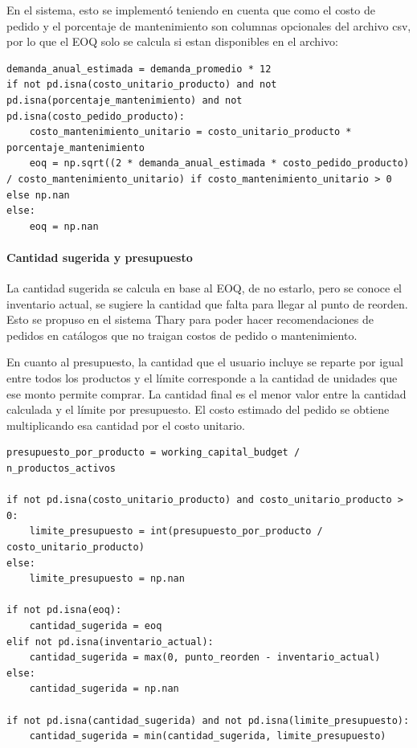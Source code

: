 En el sistema, esto se implementó teniendo en cuenta que como el costo de pedido y el porcentaje de mantenimiento son columnas opcionales del archivo csv, por lo que el EOQ solo se calcula si estan disponibles en el archivo:

\label{lst:eoq_calculo}
\begin{verbatim}
demanda_anual_estimada = demanda_promedio * 12
if not pd.isna(costo_unitario_producto) and not pd.isna(porcentaje_mantenimiento) and not pd.isna(costo_pedido_producto):
    costo_mantenimiento_unitario = costo_unitario_producto * porcentaje_mantenimiento
    eoq = np.sqrt((2 * demanda_anual_estimada * costo_pedido_producto) / costo_mantenimiento_unitario) if costo_mantenimiento_unitario > 0 else np.nan
else:
    eoq = np.nan
\end{verbatim}

\paragraph{Cantidad sugerida y presupuesto}


La cantidad sugerida se calcula en base al EOQ, de no estarlo, pero se conoce el inventario actual, se sugiere la cantidad que falta para llegar al punto de reorden. Esto se propuso en el sistema Thary para poder hacer recomendaciones de pedidos en catálogos que no traigan costos de pedido o mantenimiento.

En cuanto al presupuesto, la cantidad que el usuario incluye se reparte por igual entre todos los productos y el límite corresponde a la cantidad de unidades que ese monto permite comprar. La cantidad final es el menor valor entre la cantidad calculada y el límite por presupuesto. El costo estimado del pedido se obtiene multiplicando esa cantidad por el costo unitario.

\label{lst:cantidad_sugerida_presupuesto}
\begin{verbatim}
presupuesto_por_producto = working_capital_budget / n_productos_activos

if not pd.isna(costo_unitario_producto) and costo_unitario_producto > 0:
    limite_presupuesto = int(presupuesto_por_producto / costo_unitario_producto)
else:
    limite_presupuesto = np.nan

if not pd.isna(eoq):
    cantidad_sugerida = eoq
elif not pd.isna(inventario_actual):
    cantidad_sugerida = max(0, punto_reorden - inventario_actual)
else:
    cantidad_sugerida = np.nan

if not pd.isna(cantidad_sugerida) and not pd.isna(limite_presupuesto):
    cantidad_sugerida = min(cantidad_sugerida, limite_presupuesto)
\end{verbatim}

